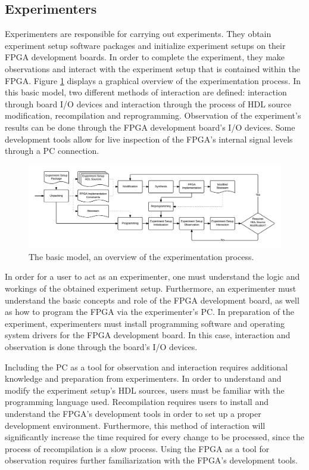 \documentclass[openright]{uva-bachelor-thesis}
\begin{document}
\subsection{Experimenters}

Experimenters are responsible for carrying out experiments. They obtain experiment setup software packages and initialize experiment setups on their FPGA development boards. In order to complete the experiment, they make observations and interact with the experiment setup that is contained within the FPGA. Figure \ref{fig:process-experimentation-basic} displays a graphical overview of the experimentation process. In this basic model, two different methods of interaction are defined: interaction through board I/O devices and interaction through the process of HDL source modification, recompilation and reprogramming. Observation of the experiment's results can be done through the FPGA development board's I/O devices. Some development tools allow for live inspection of the FPGA's internal signal levels through a PC connection.

\begin{figure}[h]
    \centering
    \includegraphics[width=\textwidth]{processes-basic-experimentation}
    \caption{The basic model, an overview of the experimentation process.}
    \label{fig:process-experimentation-basic}
\end{figure}

In order for a user to act as an experimenter, one must understand the logic and workings of the obtained experiment setup. Furthermore, an experimenter must understand the basic concepts and role of the FPGA development board, as well as how to program the FPGA via the experimenter's PC. In preparation of the experiment, experimenters must install programming software and operating system drivers for the FPGA development board. In this case, interaction and observation is done through the board's I/O devices. 

Including the PC as a tool for observation and interaction requires additional knowledge and preparation from experimenters. In order to understand and modify the experiment setup's HDL sources, users must be familiar with the programming language used. Recompilation requires users to install and understand the FPGA's development tools in order to set up a proper development environment. Furthermore, this method of interaction will significantly increase the time required for every change to be processed, since the process of recompilation is a slow process. Using the FPGA as a tool for observation requires further familiarization with the FPGA's development tools.
\end{document}
